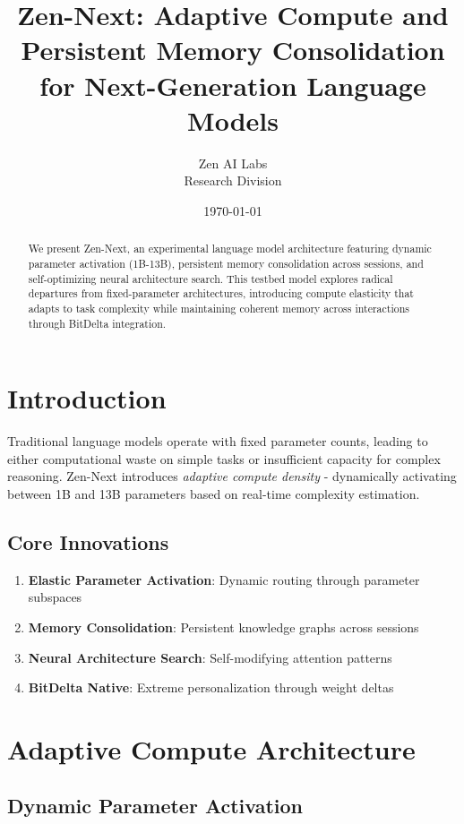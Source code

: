\documentclass[11pt,a4paper]{article}
\title{Zen-Next: Adaptive Compute and Persistent Memory Consolidation for Next-Generation Language Models}
\author{Zen AI Labs\\Research Division}
\date{\today}
\theoremstyle{definition}
\begin{document}
\maketitle

\begin{abstract}
We present Zen-Next, an experimental language model architecture featuring dynamic parameter activation (1B-13B), persistent memory consolidation across sessions, and self-optimizing neural architecture search. This testbed model explores radical departures from fixed-parameter architectures, introducing compute elasticity that adapts to task complexity while maintaining coherent memory across interactions through BitDelta integration.
\end{abstract}

\section{Introduction}

Traditional language models operate with fixed parameter counts, leading to either computational waste on simple tasks or insufficient capacity for complex reasoning. Zen-Next introduces \textit{adaptive compute density} - dynamically activating between 1B and 13B parameters based on real-time complexity estimation.

\subsection{Core Innovations}

\begin{enumerate}
\item \textbf{Elastic Parameter Activation}: Dynamic routing through parameter subspaces
\item \textbf{Memory Consolidation}: Persistent knowledge graphs across sessions
\item \textbf{Neural Architecture Search}: Self-modifying attention patterns
\item \textbf{BitDelta Native}: Extreme personalization through weight deltas
\end{enumerate}

\section{Adaptive Compute Architecture}

\subsection{Dynamic Parameter Activation}
\end{document}
